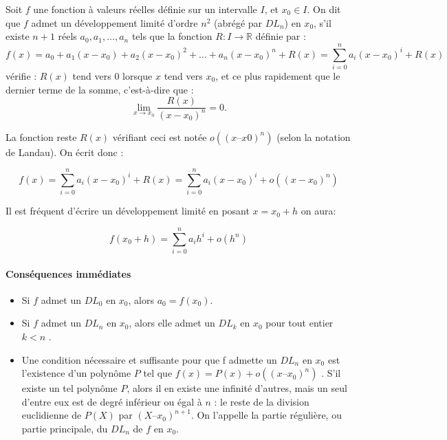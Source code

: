 Soit $f$ une fonction à valeurs réelles définie sur un intervalle $I$, et $x_0 \in I$. On dit que $f$ admet un développement limité d'ordre $n^2$ (abrégé par $DL_n$) en $x_0$, s'il existe $n + 1$ réels $a_0, a_1, \dots, a_n$  tels que la fonction ${\displaystyle R:I\to \mathbb {R} }$ définie par :
$${\displaystyle f(x)=a_{0}+a_{1}(x-x_{0})+a_{2}(x-x_{0})^{2}+\dots+a_{n}(x-x_{0})^{n}+R(x)=\sum _{i=0}^{n}a_{i}(x-x_{0})^{i}+R(x)}$$
vérifie : $R(x)$ tend vers $0$ lorsque $x$ tend vers $x_0$, et ce plus rapidement que le dernier terme de la somme, c'est-à-dire que :
$$
\lim _{{x\rightarrow x_{0}}}{\frac{R(x)}{(x-x_{0})^{n}}}=0. 
$$

La fonction reste $R(x)$ vérifiant ceci est notée $o((x – x0)^n)$ (selon la notation de Landau). On écrit donc :

$$
f(x)= \sum _{i=0}^{n}a_{i}(x-x_{0})^{i}+R(x) =\sum _{{i=0}}^{n}a_{i}(x-x_{0})^{i}+o((x-x_{0})^{n})
$$


Il est fréquent d'écrire un développement limité en posant $x = x_0 + h$ on aura:

\begin{equation}\label{eq:dev_lim_h}
f(x_{0}+h)=\sum _{{i=0}}^{n}a_{i}h^{i}+o(h^{n})
\end{equation}


\paragraph*{Conséquences immédiates}
\begin{itemize}
	\item Si $f$ admet un $DL_0$ en $x_0$, alors $a_0 = f(x_0)$. \cite{coulombeau2013math}
	\item Si $f$ admet un $DL_n$ en $x_0$, alors elle admet un $DL_k$ en $x_0$ pour tout entier $k < n$ \cite{coulombeau2013math}.
	\item Une condition nécessaire et suffisante pour que f admette un $DL_n$ en $x_0$ est l'existence d'un polynôme $P$ tel que $f(x) = P(x) + o((x – x_0)^n)$ \cite{coulombeau2013math}. S'il existe un tel polynôme $P$, alors il en existe une infinité d'autres, mais un seul d'entre eux est de degré inférieur ou égal à $n$ : le reste de la division euclidienne de $P(X)$ par $(X – x_0)^{n+1}$. On l'appelle la partie régulière, ou partie principale, du $DL_n$ de $f$ en $x_0$. %
\end{itemize}



